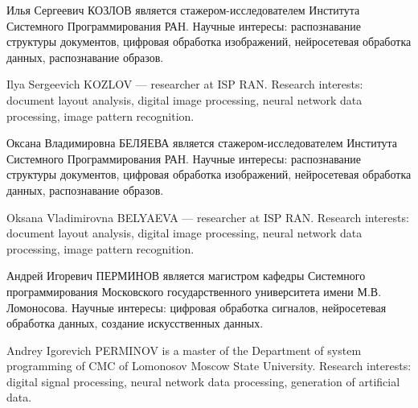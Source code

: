 \documentclass{ProcISPRAS}
\begin{document}
Илья Сергеевич КОЗЛОВ  является стажером-исследователем Института Системного Программирования РАН. Научные интересы: распознавание структуры документов, цифровая обработка изображений, нейросетевая обработка данных, распознавание образов.

Ilya Sergeevich KOZLOV --- researcher at ISP RAN. Research interests: document layout analysis, digital image processing, neural network data processing, image pattern recognition.

Оксана Владимировна БЕЛЯЕВА является стажером-исследователем Института Системного Программирования РАН. Научные интересы: распознавание структуры документов, цифровая обработка изображений, нейросетевая обработка данных, распознавание образов.

Oksana Vladimirovna BELYAEVA --- researcher at ISP RAN. Research interests: document layout analysis, digital image processing, neural network data processing, image pattern recognition.

Андрей Игоревич ПЕРМИНОВ является магистром кафедры Системного программирования Московского государственного университета имени М.В. Ломоносова. Научные интересы: цифровая обработка сигналов, нейросетевая обработка данных, создание искусственных данных.

Andrey Igorevich PERMINOV is a master of the Department of system programming of CMC of Lomonosov Moscow State University. Research interests: digital signal processing, neural network data processing, generation of artificial data.
\end{document}
